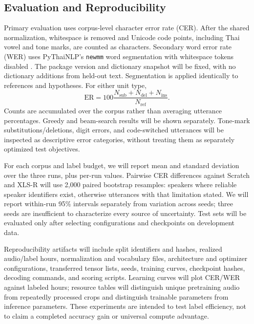 \subsection{Evaluation and Reproducibility}
Primary evaluation uses corpus-level character error rate (CER). After the shared normalization, whitespace is removed and Unicode code points, including Thai vowel and tone marks, are counted as characters. Secondary word error rate (WER) uses PyThaiNLP's \texttt{newmm} word segmentation with whitespace tokens disabled \cite{pythainlptokenize}. The package version and dictionary snapshot will be fixed, with no dictionary additions from held-out text. Segmentation is applied identically to references and hypotheses. For either unit type,
\begin{equation}
\mathrm{ER}=100\frac{N_{\mathrm{sub}}+N_{\mathrm{del}}+N_{\mathrm{ins}}}
{N_{\mathrm{ref}}}.
\end{equation}
Counts are accumulated over the corpus rather than averaging utterance percentages. Greedy and beam-search results will be shown separately. Tone-mark substitutions/deletions, digit errors, and code-switched utterances will be inspected as descriptive error categories, without treating them as separately optimized test objectives.

For each corpus and label budget, we will report mean and standard deviation over the three runs, plus per-run values. Pairwise CER differences against Scratch and XLS-R will use 2,000 paired bootstrap resamples: speakers where reliable speaker identifiers exist, otherwise utterances with that limitation stated. We will report within-run 95\% intervals separately from variation across seeds; three seeds are insufficient to characterize every source of uncertainty. Test sets will be evaluated only after selecting configurations and checkpoints on development data.

Reproducibility artifacts will include split identifiers and hashes, realized audio/label hours, normalization and vocabulary files, architecture and optimizer configurations, transferred tensor lists, seeds, training curves, checkpoint hashes, decoding commands, and scoring scripts. Learning curves will plot CER/WER against labeled hours; resource tables will distinguish unique pretraining audio from repeatedly processed crops and distinguish trainable parameters from inference parameters. These experiments are intended to test label efficiency, not to claim a completed accuracy gain or universal compute advantage.
